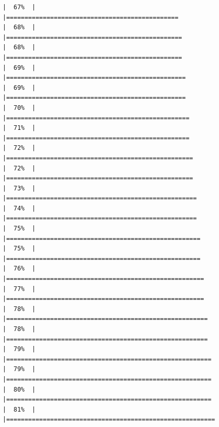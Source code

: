 \documentclass[
  english,
  man,a4paper,mask,floatsintext]{apa6}
\begin{document}
\begin{verbatim}
|  67%  |                                                                              |===============================================                       |  68%  |                                                                              |================================================                      |  68%  |                                                                              |================================================                      |  69%  |                                                                              |=================================================                     |  69%  |                                                                              |=================================================                     |  70%  |                                                                              |==================================================                    |  71%  |                                                                              |==================================================                    |  72%  |                                                                              |===================================================                   |  72%  |                                                                              |===================================================                   |  73%  |                                                                              |====================================================                  |  74%  |                                                                              |====================================================                  |  75%  |                                                                              |=====================================================                 |  75%  |                                                                              |=====================================================                 |  76%  |                                                                              |======================================================                |  77%  |                                                                              |======================================================                |  78%  |                                                                              |=======================================================               |  78%  |                                                                              |=======================================================               |  79%  |                                                                              |========================================================              |  79%  |                                                                              |========================================================              |  80%  |                                                                              |========================================================              |  81%  |                                                                              |=========================================================             
\end{verbatim}
\end{document}
